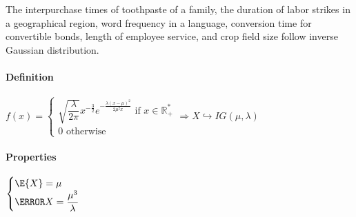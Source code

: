The interpurchase times of toothpaste of a family, the duration of labor 
strikes in a geographical region, word frequency in a language, conversion
time for convertible bonds, length of employee service, and crop field size
follow inverse Gaussian distribution.
\paragraph{Definition}
\begin{center}
	$f(x)=\begin{cases}\sqrt{\dfrac{\lambda}{2\pi}}x^{-\frac{3}{2}}e^{-\frac{\lambda(x-\mu)^{2}}{2\mu^{2}x}}\text{ if }x\in\mathbb{R}_{+}^{*}\\0\text{ otherwise}\end{cases}\Rightarrow X\hookrightarrow IG(\mu,\lambda)$
\end{center}
\paragraph{Properties}
\begin{center}
	$\begin{cases}
	\E{X}=\mu\\
	\V{X}=\dfrac{\mu^{3}}{\lambda}
	\end{cases}$
\end{center}
